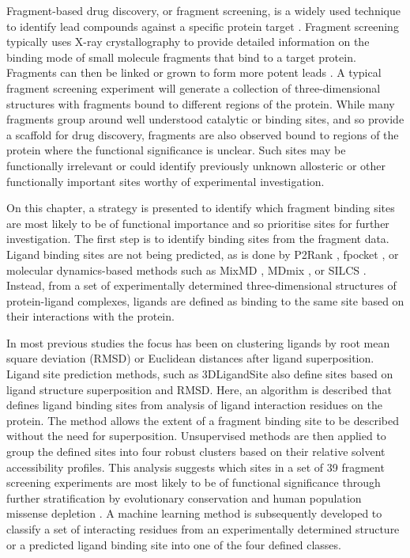 Fragment-based drug discovery, or fragment screening, is a widely used technique to identify lead compounds against a specific protein target \cite{MURRAY_2009_FBDD}. Fragment screening typically uses X-ray crystallography to provide detailed information on the binding mode of small molecule fragments that bind to a target protein. Fragments can then be linked or grown to form more potent leads \cite{CONGREVE_2003_RO3, REES_2004_FBLD, SCHIEBEL_2016_FRAGMENTS}. A typical fragment screening experiment will generate a collection of three-dimensional structures with fragments bound to different regions of the protein. While many fragments group around well understood catalytic or binding sites, and so provide a scaffold for drug discovery, fragments are also observed bound to regions of the protein where the functional significance is unclear. Such sites may be functionally irrelevant or could identify previously unknown allosteric or other functionally important sites worthy of experimental investigation. 

On this chapter, a strategy is presented to identify which fragment binding sites are most likely to be of functional importance and so prioritise sites for further investigation. The first step is to identify binding sites from the fragment data. Ligand binding sites are not being predicted, as is done by P2Rank \cite{KRIVAK_2018_P2RANK}, fpocket \cite{GUILLOUX_2009_FPOCKET}, or molecular dynamics-based methods such as MixMD \cite{LEXA_2011_FLEXIBILITY, GHANAKOTA_2018_MIXMD}, MDmix \cite{ALVAREZ_2014_MIXMD}, or SILCS \cite{FALLER_2015_SILCS}. Instead, from a set of experimentally determined three-dimensional structures of protein-ligand complexes, ligands are defined as binding to the same site based on their interactions with the protein.

In most previous studies the focus has been on clustering ligands by root mean square deviation (RMSD) \cite{SHIN_2005_PDBLIGAND} or Euclidean distances \cite{KOZAKOV_2005_CLUSTERING} after ligand superposition. Ligand site prediction methods, such as 3DLigandSite \cite{WASS_2010_3DLIGANDSITE, MCGREIG_2022_3DLIGANDSITE} also define sites based on ligand structure superposition and RMSD. Here, an algorithm is described that defines ligand binding sites from analysis of ligand interaction residues on the protein. The method allows the extent of a fragment binding site to be described without the need for superposition. Unsupervised methods are then applied to group the defined sites into four robust clusters based on their relative solvent accessibility profiles. This analysis suggests which sites in a set of 39 fragment screening experiments are most likely to be of functional significance through further stratification by evolutionary conservation and human population missense depletion \cite{MACGOWAN_2017_VARIANTS, MACGOWAN_2024_VARIANTS}. A machine learning method is subsequently developed to classify a set of interacting residues from an experimentally determined structure or a predicted ligand binding site into one of the four defined classes.

